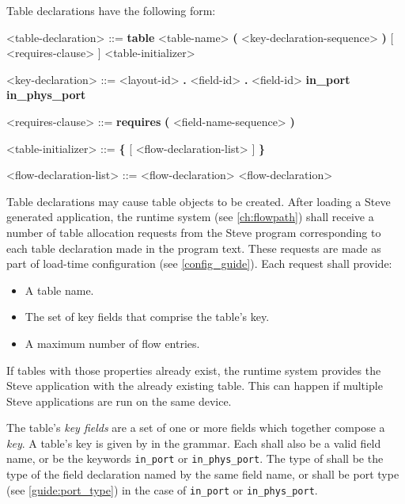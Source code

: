 Table declarations have the following form:

\begin{minip}
\begin{grammar}
<table-declaration> ::=
\textbf{table} <table-name> \textbf{(} <key-declaration-sequence> \textbf{)}
[ <requires-clause> ] <table-initializer>

<key-declaration> ::=
<layout-id> \textbf{.} <field-id>
 \textbf{.} <field-id>
\alt \textbf{in\_port}
\alt \textbf{in\_phys\_port}

<requires-clause> ::=
\textbf{requires} \textbf{(} <field-name-sequence> \textbf{)}

<table-initializer> ::= \textbf{\{} [ <flow-declaration-list> ] \textbf{\}}

<flow-declaration-list> ::= <flow-declaration>
 <flow-declaration>
\end{grammar}
\end{minip}

Table declarations may cause table objects to be created. After loading a Steve generated application, the runtime system (see \ref{ch:flowpath}) shall receive a number of table allocation requests from the Steve program corresponding to each table declaration made in the program text. These requests are made as part of load-time configuration (see \ref{config_guide}). Each request shall provide:

\begin{itemize}
\item A table name.
\item The set of key fields that comprise the table's key.
\item A maximum number of flow entries.
\end{itemize}

If tables with those properties already exist, the runtime system provides the Steve application with the already existing table. This can happen if multiple Steve applications are run on the same device.

The table's \textit{key fields} are a set of one or more fields which together compose a \textit{key}. A table's key is given by  in the grammar. Each  shall also be a valid field name, or be the keywords \texttt{in\_port} or \texttt{in\_phys\_port}. The type of  shall be the type of the field declaration named by the same field name, or shall be port type (see \ref{guide:port_type}) in the case of \texttt{in\_port} or \texttt{in\_phys\_port}.

